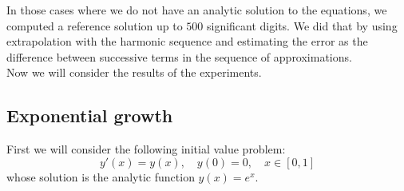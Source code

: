 
In those cases where we do not have an analytic solution to the equations, we computed a reference solution up to \(500\) significant digits. We did that by using extrapolation with the harmonic sequence and estimating the error as the difference between successive terms in the sequence of approximations.\\

Now we will consider the results of the experiments.

\subsection{Exponential growth}
First we will consider the following initial value problem:
\begin{equation}\label{42}
y'(x) = y(x),\quad y(0) = 0, \quad x\in [0,1]
\end{equation}
whose solution is the analytic function \(y(x) = e^x\).

